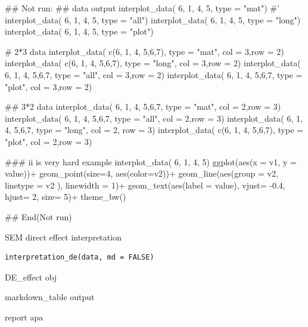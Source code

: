 \documentclass[a4paper]{book}
\begin{document}
\begin{Examples}
\begin{ExampleCode}
## Not run: 
 ## data output
interplot_data( 6, 1, 4, 5, type = "mat")
#' interplot_data( 6, 1, 4, 5, type = "all")
interplot_data( 6, 1, 4, 5, type = "long")
interplot_data( 6, 1, 4, 5, type = "plot")

# 2*3 data
interplot_data( c(6, 1, 4, 5,6,7), type = "mat",  col = 3,row = 2)
interplot_data( c(6, 1, 4, 5,6,7), type = "long",  col = 3,row = 2)
interplot_data( 6, 1, 4, 5,6,7, type = "all",  col = 3,row = 2)
interplot_data( 6, 1, 4, 5,6,7, type = "plot",  col = 3,row = 2)

## 3*2 data
interplot_data( 6, 1, 4, 5,6,7, type = "mat",  col = 2,row = 3)
interplot_data( 6, 1, 4, 5,6,7, type = "all",  col = 2,row = 3)
interplot_data( 6, 1, 4, 5,6,7, type = "long",  col = 2, row = 3)
interplot_data( c(6, 1, 4, 5,6,7), type = "plot",  col = 2,row = 3)

### ii is very hard example
interplot_data( 6, 1, 4, 5) %
ggplot(aes(x = v1, y = value))+
geom_point(size=4, aes(color=v2))+
geom_line(aes(group = v2, linetype = v2 ), linewidth = 1)+
geom_text(aes(label = value), vjust= -0.4, hjust= 2, size= 5)+
theme_bw()


## End(Not run)
\end{ExampleCode}
\end{Examples}
%
\begin{Description}
SEM direct effect interpretation
\end{Description}
%
\begin{Usage}
\begin{verbatim}
interpretation_de(data, md = FALSE)
\end{verbatim}
\end{Usage}
%
\begin{Arguments}
\begin{ldescription}
\item[\code{data}] DE\_effect obj

\item[\code{md}] markdown\_table output
\end{ldescription}
\end{Arguments}
%
\begin{Value}
report apa
\end{Value}
%
\end{document}
